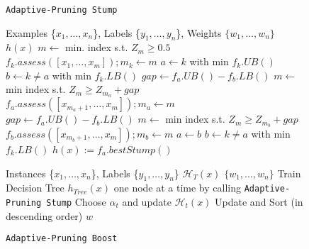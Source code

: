 \begin{wrapfigure}{R}{0.5\textwidth}
\vspace{-2.5em}
\begin{minipage}[t]{0.5\textwidth}
\begin{algorithm}[H]
\caption{\texttt{Adaptive-Pruning Stump}}\label{adaptive-pruning-stump}
\begin{algorithmic}
    Examples \{$x_1, \dots, x_n$\}, Labels \{$y_1, \dots, y_n$\}, Weights $\{w_{1},\dots,w_{n}\}$
     $h(x)$  
    \STATE $m \gets$ min. index s.t. $Z_m \ge 0.5$
        \STATE $f_k.assess([x_1, \dots, x_m]); m_k \gets m$
    \ENDFOR
    \STATE $a \gets k$ with min $f_k.UB()$
    \STATE $b \gets k \ne a$ with min $f_k.LB()$
        \STATE $gap \gets f_a.UB() - f_b.LB()$
        \STATE $m \gets$ min index s.t. $Z_m \ge Z_{m_a} + gap$
        \STATE $f_a.assess([x_{m_a+1}, \dots, x_m]); m_a \gets m$
        \STATE $gap \gets f_a.UB() - f_b.LB()$
            \STATE $m \gets$ min index s.t. $Z_m \ge Z_{m_b} + gap$
            \STATE $f_b.assess([x_{m_b+1}, \dots, x_m]); m_b \gets m$
        \ENDIF
            \STATE $a \gets b$
        \ENDIF
        \STATE $b \gets k \ne a$ with min $f_k.LB()$
    \ENDWHILE
     $h(x) := f_a.bestStump()$
\end{algorithmic}
\end{algorithm}
\end{minipage}
%
\begin{minipage}[t]{0.5\textwidth}
\begin{algorithm}[H]
\caption{\texttt{Adaptive-Pruning Boost}}\label{boosting}
\begin{algorithmic}
    Instances \{$x_1, \dots, x_n$\}, Labels \{$y_1, \dots, y_n$\}
    $\mathcal{H}_T(x)$
    $\{w_{1},\dots,w_{n}\}$   
   \STATE Train Decision Tree $h_{Tree}(x)$ one node at a time by calling \texttt{Adaptive-Pruning Stump}
   \STATE Choose $\alpha_t$ and update $\mathcal{H}_t(x)$
   \STATE Update and Sort (in descending order) $w$
   \ENDFOR
\end{algorithmic}
\end{algorithm}
\end{minipage}
\vspace{-6em}
\end{wrapfigure}

